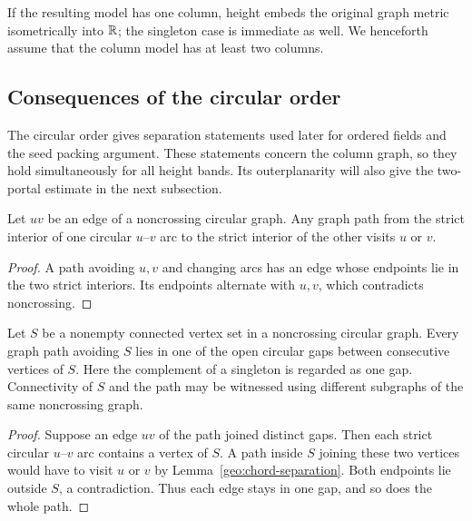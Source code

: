 If the resulting model has one column, height embeds the original graph
metric isometrically into $\mathbb R$; the singleton case is immediate as well.
We henceforth assume that the column model has at least two columns.



\subsection{Consequences of the circular order}

The circular order gives separation statements used later for ordered
fields and the seed packing argument. These statements concern the column
graph, so they hold simultaneously for all height bands. Its outerplanarity
will also give the two-portal estimate in the next subsection.

\begin{lemma}\label{geo:chord-separation}
Let $uv$ be an edge of a noncrossing circular graph.  Any graph path from
the strict interior of one circular $u$--$v$ arc to the strict interior of
the other visits $u$ or $v$.
\end{lemma}

\begin{proof}
A path avoiding $u,v$ and changing arcs has an edge whose endpoints lie
in the two strict interiors.  Its endpoints alternate with $u,v$, which
contradicts noncrossing.
\end{proof}

\begin{lemma}\label{geo:gap}
Let $S$ be a nonempty connected vertex set in a noncrossing circular graph.
Every graph path avoiding $S$ lies in one of the open circular gaps between
consecutive vertices of $S$.  Here the complement of a singleton is regarded
as one gap.  Connectivity of $S$ and the path may be witnessed using
different subgraphs of the same noncrossing graph.
\end{lemma}

\begin{proof}
Suppose an edge $uv$ of the path joined distinct gaps.  Then each strict
circular $u$--$v$ arc contains a vertex of $S$.  A path inside $S$ joining
these two vertices would have to visit $u$ or $v$ by
Lemma~\ref{geo:chord-separation}.  Both endpoints lie outside $S$, a
contradiction.  Thus each edge stays in one gap, and so does the whole path.
\end{proof}

